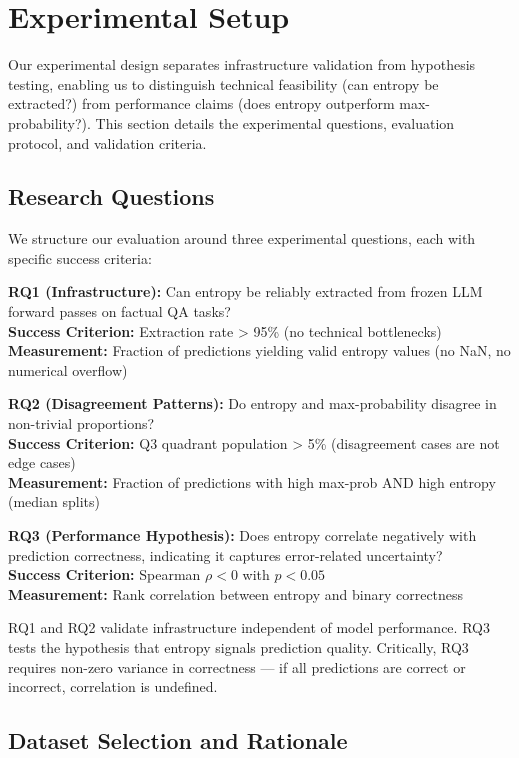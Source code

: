\section{Experimental Setup}

Our experimental design separates infrastructure validation from hypothesis testing, enabling us to distinguish technical feasibility (can entropy be extracted?) from performance claims (does entropy outperform max-probability?). This section details the experimental questions, evaluation protocol, and validation criteria.

\subsection{Research Questions}

We structure our evaluation around three experimental questions, each with specific success criteria:

\textbf{RQ1 (Infrastructure):} Can entropy be reliably extracted from frozen LLM forward passes on factual QA tasks?\\
\textbf{Success Criterion:} Extraction rate > 95\% (no technical bottlenecks)\\
\textbf{Measurement:} Fraction of predictions yielding valid entropy values (no NaN, no numerical overflow)

\textbf{RQ2 (Disagreement Patterns):} Do entropy and max-probability disagree in non-trivial proportions?\\
\textbf{Success Criterion:} Q3 quadrant population > 5\% (disagreement cases are not edge cases)\\
\textbf{Measurement:} Fraction of predictions with high max-prob AND high entropy (median splits)

\textbf{RQ3 (Performance Hypothesis):} Does entropy correlate negatively with prediction correctness, indicating it captures error-related uncertainty?\\
\textbf{Success Criterion:} Spearman $\rho < 0$ with $p < 0.05$\\
\textbf{Measurement:} Rank correlation between entropy and binary correctness

RQ1 and RQ2 validate infrastructure independent of model performance. RQ3 tests the hypothesis that entropy signals prediction quality. Critically, RQ3 requires non-zero variance in correctness --- if all predictions are correct or incorrect, correlation is undefined.

\subsection{Dataset Selection and Rationale}

